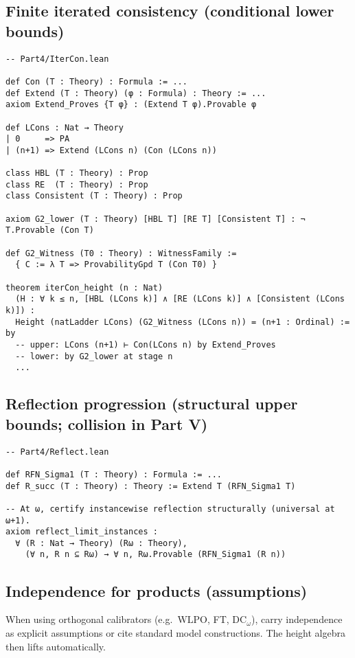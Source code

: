 \documentclass[11pt]{article}
\theoremstyle{definition}
\theoremstyle{remark}
\newcommand{\WLPO}{\mathrm{WLPO}}
\begin{document}
\subsection*{Finite iterated consistency (conditional lower bounds)}
\begin{verbatim}
-- Part4/IterCon.lean

def Con (T : Theory) : Formula := ...
def Extend (T : Theory) (φ : Formula) : Theory := ...
axiom Extend_Proves {T φ} : (Extend T φ).Provable φ

def LCons : Nat → Theory
| 0     => PA
| (n+1) => Extend (LCons n) (Con (LCons n))

class HBL (T : Theory) : Prop
class RE  (T : Theory) : Prop
class Consistent (T : Theory) : Prop

axiom G2_lower (T : Theory) [HBL T] [RE T] [Consistent T] : ¬ T.Provable (Con T)

def G2_Witness (T0 : Theory) : WitnessFamily :=
  { C := λ T => ProvabilityGpd T (Con T0) }

theorem iterCon_height (n : Nat)
  (H : ∀ k ≤ n, [HBL (LCons k)] ∧ [RE (LCons k)] ∧ [Consistent (LCons k)]) :
  Height (natLadder LCons) (G2_Witness (LCons n)) = (n+1 : Ordinal) := by
  -- upper: LCons (n+1) ⊢ Con(LCons n) by Extend_Proves
  -- lower: by G2_lower at stage n
  ...
\end{verbatim}

\subsection*{Reflection progression (structural upper bounds; collision in Part V)}
\begin{verbatim}
-- Part4/Reflect.lean

def RFN_Sigma1 (T : Theory) : Formula := ...
def R_succ (T : Theory) : Theory := Extend T (RFN_Sigma1 T)

-- At ω, certify instancewise reflection structurally (universal at ω+1).
axiom reflect_limit_instances :
  ∀ (R : Nat → Theory) (Rω : Theory),
    (∀ n, R n ⊆ Rω) → ∀ n, Rω.Provable (RFN_Sigma1 (R n))
\end{verbatim}

\subsection*{Independence for products (assumptions)}
When using orthogonal calibrators (e.g.\ \(\WLPO\), FT, $\mathrm{DC}_\omega$), carry independence as explicit assumptions or cite standard model constructions. The height algebra then lifts automatically.
\end{document}

